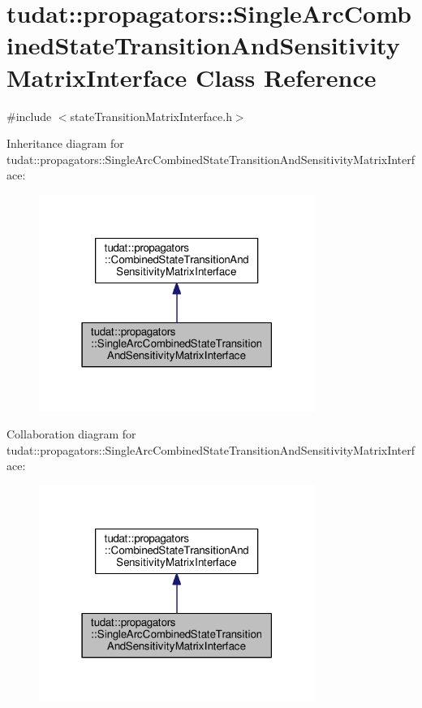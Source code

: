 \hypertarget{classtudat_1_1propagators_1_1SingleArcCombinedStateTransitionAndSensitivityMatrixInterface}{}\section{tudat\+:\+:propagators\+:\+:Single\+Arc\+Combined\+State\+Transition\+And\+Sensitivity\+Matrix\+Interface Class Reference}
\label{classtudat_1_1propagators_1_1SingleArcCombinedStateTransitionAndSensitivityMatrixInterface}


{\ttfamily \#include $<$state\+Transition\+Matrix\+Interface.\+h$>$}



Inheritance diagram for tudat\+:\+:propagators\+:\+:Single\+Arc\+Combined\+State\+Transition\+And\+Sensitivity\+Matrix\+Interface\+:
\nopagebreak
\begin{figure}[H]
\begin{center}
\leavevmode
\includegraphics[width=255pt]{classtudat_1_1propagators_1_1SingleArcCombinedStateTransitionAndSensitivityMatrixInterface__inherit__graph}
\end{center}
\end{figure}


Collaboration diagram for tudat\+:\+:propagators\+:\+:Single\+Arc\+Combined\+State\+Transition\+And\+Sensitivity\+Matrix\+Interface\+:
\nopagebreak
\begin{figure}[H]
\begin{center}
\leavevmode
\includegraphics[width=255pt]{classtudat_1_1propagators_1_1SingleArcCombinedStateTransitionAndSensitivityMatrixInterface__coll__graph}
\end{center}
\end{figure}
